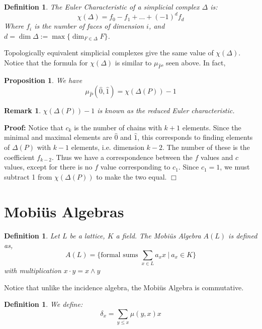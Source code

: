 \documentclass[11pt]{article}
\newtheorem{proposition}[theorem]{Proposition}
\newtheorem{definition}[theorem]{Definition}
\newtheorem{remark}[theorem]{Remark}
\newenvironment{proof}{\noindent \textbf{Proof:}}{$\Box$}
\begin{document}
\begin{definition}
The \emph{Euler Characteristic} of a simplicial complex $\Delta$ is:
$$\chi(\Delta)=f_0-f_1+\ldots +(-1)^d f_d$$
Where $f_i$ is the number of faces of dimension $i$, and $d=\operatorname{dim} \Delta:=\max \{\operatorname{dim}_{F\in \Delta} F\}$.
\end{definition}

Topologically equivalent simplicial complexes give the same value of $\chi(\Delta)$. Notice that the formula for $\chi(\Delta)$ is similar to $\mu_{\hat{P}}$, seen above. In fact,

\begin{proposition}
We have
$$\mu_{\hat{P}}(\hat{0},\hat{1})=\chi(\Delta(P))-1$$
\end{proposition}

\begin{remark}
$\chi(\Delta(P))-1$ is known as the reduced Euler characteristic.
\end{remark}

\begin{proof}
Notice that $c_k$ is the number of chains with $k+1$ elements. Since the minimal and maximal elements are $\hat{0}$ and $\hat{1}$, this corresponds to finding elements of $\Delta(P)$ with $k-1$ elements, i.e. dimension $k-2$. The number of these is the coefficient $f_{k-2}$. Thus we have a correspondence between the $f$ values and $c$ values, except for there is no $f$ value corresponding to $c_1$. Since $c_1=1$, we must subtract 1 from $\chi(\Delta(P))$ to make the two equal.
\end{proof}

\section{Mobi\"{u}s Algebras}

\begin{definition}
Let $L$ be a lattice, $K$ a field. The \emph{Mobi\"{u}s Algebra} $A(L)$ is defined as,
$$A(L)=\{\mbox{formal sums } \sum_{x \in L} a_xx \: | \: a_x \in K\}$$
with multiplication $x\cdot y=x \wedge y$ 
\end{definition}

Notice that unlike the incidence algebra, the Mobi\"{u}s Algebra is commutative.

\begin{definition}\label{delta def}
We define:
$$\delta_x=\sum_{y \le x} \mu(y,x)x$$
\end{definition}
\end{document}
